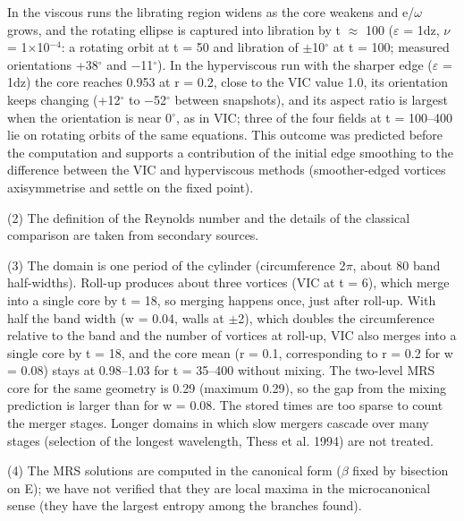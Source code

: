 \documentclass[11pt]{article}
\begin{document}
In the viscous runs the librating region widens as the core weakens and e/$\omega{}$ grows, and the rotating ellipse is captured into libration by t $\approx{}$ 100 ($\varepsilon{}$ = 1dz, $\nu{}$ = 1$\times{}$10$^{-4}$: a rotating orbit at t = 50 and libration of $\pm{}$10$^\circ$ at t = 100; measured orientations +38$^\circ$ and $-$11$^\circ$). In the hyperviscous run with the sharper edge ($\varepsilon{}$ = 1dz) the core reaches 0.953 at r = 0.2, close to the VIC value 1.0, its orientation keeps changing (+12$^\circ$ to $-$52$^\circ$ between snapshots), and its aspect ratio is largest when the orientation is near 0$^\circ$, as in VIC; three of the four fields at t = 100--400 lie on rotating orbits of the same equations. This outcome was predicted before the computation and supports a contribution of the initial edge smoothing to the difference between the VIC and hyperviscous methods (smoother-edged vortices axisymmetrise and settle on the fixed point).

(2) The definition of the Reynolds number and the details of the classical comparison are taken from secondary sources.

(3) The domain is one period of the cylinder (circumference 2$\pi{}$, about 80 band half-widths). Roll-up produces about three vortices (VIC at t = 6), which merge into a single core by t = 18, so merging happens once, just after roll-up. With half the band width (w = 0.04, walls at $\pm{}$2), which doubles the circumference relative to the band and the number of vortices at roll-up, VIC also merges into a single core by t = 18, and the core mean (r = 0.1, corresponding to r = 0.2 for w = 0.08) stays at 0.98--1.03 for t = 35--400 without mixing. The two-level MRS core for the same geometry is 0.29 (maximum 0.29), so the gap from the mixing prediction is larger than for w = 0.08. The stored times are too sparse to count the merger stages. Longer domains in which slow mergers cascade over many stages (selection of the longest wavelength, Thess et al. 1994) are not treated.

(4) The MRS solutions are computed in the canonical form ($\beta{}$ fixed by bisection on E); we have not verified that they are local maxima in the microcanonical sense (they have the largest entropy among the branches found).
\end{document}
